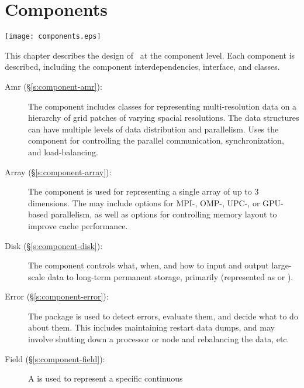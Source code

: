 \chapter{Components} \label{c:components}



\centerline{\texttt{[image: components.eps]}}

   This chapter describes the design of \cello\ at the component
   level.  Each component is described, including the component
   interdependencies, interface, and classes.

\begin{description}
%
 \item [\todo Amr (\S\ref{s:component-amr}): ]
%
        The  component includes classes for representing
        multi-resolution data on a hierarchy of grid patches of
        varying spacial resolutions.  The  data
        structures can have multiple levels of data distribution and
        parallelism.  Uses the  component for
        controlling the parallel communication, synchronization, and
        load-balancing.
%
 \item [\todo Array (\S\ref{s:component-array}): ]
%
        The  component is used for representing a single
        array of up to $3$ dimensions.  The  may include
        options for MPI-, OMP-, UPC-, or GPU-based parallelism, as
        well as options for controlling memory layout to improve cache
        performance.
%
 \item [\todo Disk (\S\ref{s:component-disk}): ]
%
        The  component controls what, when, and how to
        input and output large-scale data to long-term permanent
        storage, primarily  (represented as
         or ).
%
 \item [\todo Error (\S\ref{s:component-error}): ]
%
        The  package is used to detect errors, evaluate
        them, and decide what to do about them.  This includes
        maintaining restart data dumps, and may involve shutting down
        a processor or node and rebalancing the data, etc.
%
 \item [\todo Field (\S\ref{s:component-field}): ]
%
        A  is used to represent a specific continuous

\end{description}
